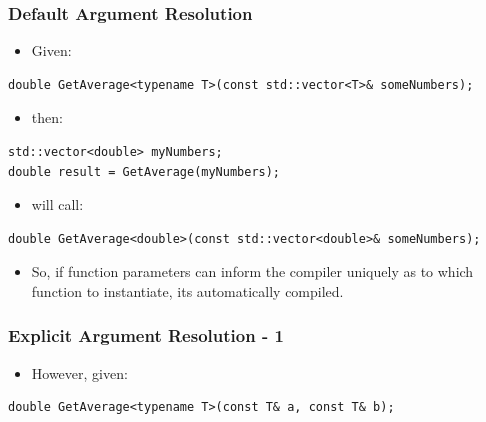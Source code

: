 \subsubsection{Default Argument
Resolution}\label{default-argument-resolution}

\begin{itemize}
\itemsep1pt\parskip0pt
\item
  Given:
\end{itemize}

\begin{verbatim}
double GetAverage<typename T>(const std::vector<T>& someNumbers);
\end{verbatim}

\begin{itemize}
\itemsep1pt\parskip0pt
\item
  then:
\end{itemize}

\begin{verbatim}
std::vector<double> myNumbers;
double result = GetAverage(myNumbers);
\end{verbatim}

\begin{itemize}
\itemsep1pt\parskip0pt
\item
  will call:
\end{itemize}

\begin{verbatim}
double GetAverage<double>(const std::vector<double>& someNumbers);
\end{verbatim}

\begin{itemize}
\itemsep1pt\parskip0pt
\item
  So, if function parameters can inform the compiler uniquely as to
  which function to instantiate, its automatically compiled.
\end{itemize}

\subsubsection{Explicit Argument Resolution -
1}\label{explicit-argument-resolution---1}

\begin{itemize}
\itemsep1pt\parskip0pt
\item
  However, given:
\end{itemize}

\begin{verbatim}
double GetAverage<typename T>(const T& a, const T& b);
\end{verbatim}

